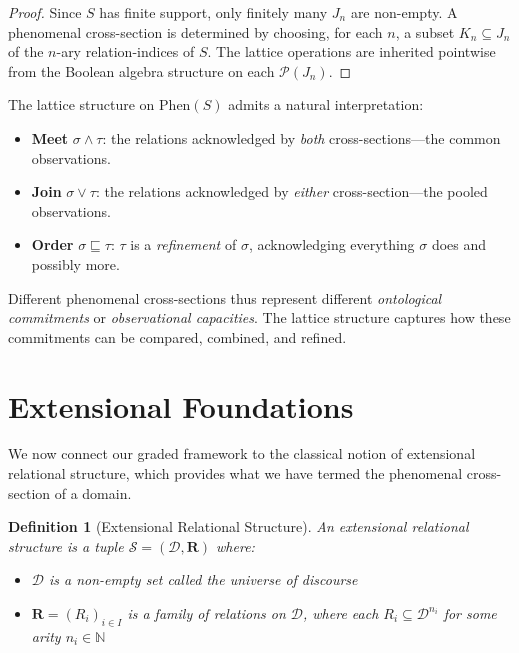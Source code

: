 \documentclass[12pt,a4paper]{article}
\newtheorem{definition}{Definition}[section]
\newcommand{\domain}{\mathcal{D}}
\newcommand{\powerset}{\mathcal{P}}
\newcommand{\Phen}{\mathrm{Phen}}
\begin{document}
\begin{proof}
Since $S$ has finite support, only finitely many $J_n$ are non-empty. A phenomenal cross-section is determined by choosing, for each $n$, a subset $K_n\subseteq J_n$ of the $n$-ary relation-indices of $S$. The lattice operations are inherited pointwise from the Boolean algebra structure on each $\powerset(J_n)$.
\end{proof}

The lattice structure on $\Phen(S)$ admits a natural interpretation:
\begin{itemize}
    \item \textbf{Meet} $\sigma \wedge \tau$: the relations acknowledged by \emph{both} cross-sections---the common observations.
    \item \textbf{Join} $\sigma \vee \tau$: the relations acknowledged by \emph{either} cross-section---the pooled observations.
    \item \textbf{Order} $\sigma \sqsubseteq \tau$: $\tau$ is a \emph{refinement} of $\sigma$, acknowledging everything $\sigma$ does and possibly more.
\end{itemize}

Different phenomenal cross-sections thus represent different \emph{ontological commitments} or \emph{observational capacities}. The lattice structure captures how these commitments can be compared, combined, and refined.

\section{Extensional Foundations}

We now connect our graded framework to the classical notion of extensional relational structure, which provides what we have termed the phenomenal cross-section of a domain.

\begin{definition}[Extensional Relational Structure]
An \emph{extensional relational structure} \citep[cf.][]{genesereth1987} is a tuple $\mathcal{S} = (\domain, \mathbf{R})$ where:
\begin{itemize}
    \item $\domain$ is a non-empty set called the \emph{universe of discourse}
    \item $\mathbf{R} = (R_i)_{i \in I}$ is a family of relations on $\domain$, where each $R_i \subseteq \domain^{n_i}$ for some arity $n_i \in \mathbb{N}$
\end{itemize}
\end{definition}
\end{document}
